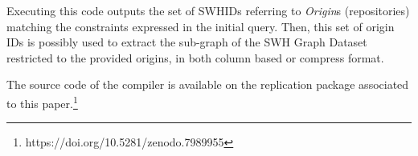 Executing this code outputs the set of SWHIDs referring to \textit{Origin}s (repositories) matching the constraints expressed in the initial query. 
Then, this set of origin IDs is possibly used to extract the sub-graph of the SWH Graph Dataset restricted to the provided origins, in both column based or compress format. 

The source code of the compiler is available on the replication package associated to this paper.\footnote{https://doi.org/10.5281/zenodo.7989955}